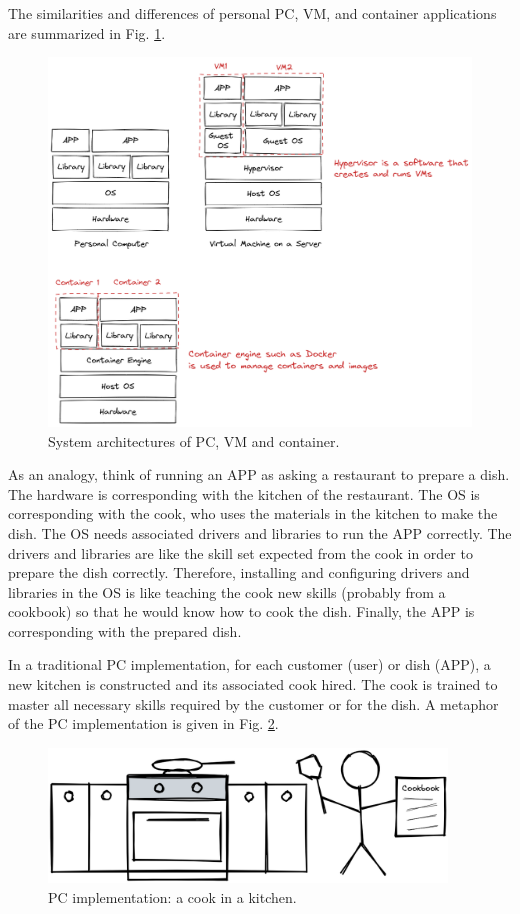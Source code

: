 The similarities and differences of personal PC, VM, and container applications are summarized in Fig. \ref{ch:vac:fig:pcvmcontainersructure}.

\begin{figure}
	\centering
	\includegraphics[width=350pt]{chapters/ch-virtualization-and-containerization/figures/pcvmcontainerstructure.png}
	\caption{System architectures of PC, VM and container.} \label{ch:vac:fig:pcvmcontainersructure}
\end{figure}

As an analogy, think of running an APP as asking a restaurant to prepare a dish. The hardware is corresponding with the kitchen of the restaurant. The OS is corresponding with the cook, who uses the materials in the kitchen to make the dish. The OS needs associated drivers and libraries to run the APP correctly. The drivers and libraries are like the skill set expected from the cook in order to prepare the dish correctly. Therefore, installing and configuring drivers and libraries in the OS is like teaching the cook new skills (probably from a cookbook) so that he would know how to cook the dish. Finally, the APP is corresponding with the prepared dish.

In a traditional PC implementation, for each customer (user) or dish (APP), a new kitchen is constructed and its associated cook hired. The cook is trained to master all necessary skills required by the customer or for the dish. A metaphor of the PC implementation is given in Fig. \ref{ch:vac:fig:acookinakitchen}.
\begin{figure}
	\centering
	\includegraphics[width=300pt]{chapters/ch-virtualization-and-containerization/figures/acookinakitchen.png}
	\caption{PC implementation: a cook in a kitchen.} \label{ch:vac:fig:acookinakitchen}
\end{figure}

